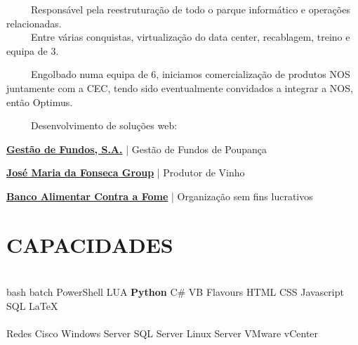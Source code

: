 \documentclass[letterpaper]{deedy-resume} %
\begin{document}
\begin{minipage}[t]{0.66\textwidth}
\sectionspace


\-\	\ \ \ \ Responsável pela reestruturação de todo o parque informático e operações relacionadas.\\
\-\	\ \ \ \ Entre várias conquistas, virtualização do data center, recablagem, treino e equipa de 3.\\

\sectionspace


\-\	\ \ \ \ Engolbado numa equipa de 6, iniciamos comercialização de produtos NOS juntamente com a CEC, tendo sido eventualmente convidados a integrar a NOS, então Optimus.

\sectionspace


\sectionspace

\-\	\ \ \ \ Desenvolvimento de soluções web:
\begin{tightitemize}
	\item \href{http://gestaodefundos.co.ao}{\textbf{Gestão de Fundos, S.A.}} | Gestão de Fundos de Poupança
	\item \href{http://www.jmf.pt/}{\textbf{José Maria da Fonseca Group}} | Produtor de Vinho
	\item \href{http://www.bancoalimentar.pt/}{\textbf{Banco Alimentar Contra a Fome}} | Organização sem fins lucrativos
\end{tightitemize}

\sectionspace

\section{CAPACIDADES}

\\
bash batch PowerShell LUA \textbullet{} \textbf{Python} C\# VB Flavours \textbullet{} HTML CSS Javascript \textbullet{} SQL \LaTeX{}\\
\\
Redes Cisco \textbullet{} Windows Server \textbullet{} SQL Server \textbullet{} Linux Server \textbullet{} VMware vCenter\\

\end{minipage} %
\end{document}
